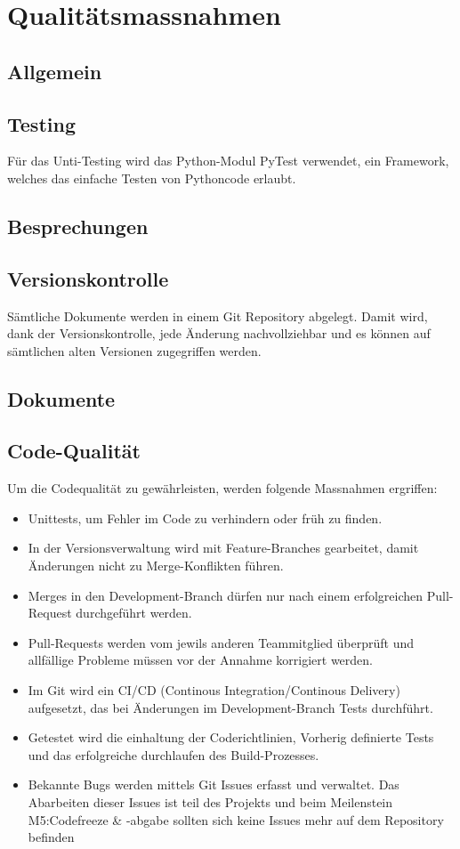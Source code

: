 \documentclass[
	ngerman,
	toc=listof, %
	toc=bibliography, %
	footnotes=multiple, %
	parskip=half, %
	numbers=noendperiod %
]{scrartcl}
\begin{document}
		

\section{Qualitätsmassnahmen}
	\subsection{Allgemein}

	\subsection{Testing}
		Für das Unti-Testing wird das Python-Modul PyTest verwendet, ein Framework, welches das einfache Testen von Pythoncode erlaubt.

	\subsection{Besprechungen}

	\subsection{Versionskontrolle}
		Sämtliche Dokumente werden in einem Git Repository abgelegt. Damit wird, dank der Versionskontrolle, 
		jede Änderung nachvollziehbar und es können auf sämtlichen alten Versionen zugegriffen werden.

	\subsection{Dokumente}

	\subsection{Code-Qualität}
		Um die Codequalität zu gewährleisten, werden folgende Massnahmen ergriffen:
		\begin{itemize}
			\item Unittests, um Fehler im Code zu verhindern oder früh zu finden.
			\item In der Versionsverwaltung wird mit Feature-Branches gearbeitet, damit Änderungen nicht zu Merge-Konflikten führen.
			\item Merges in den Development-Branch dürfen nur nach einem erfolgreichen Pull-Request durchgeführt werden.
			\item Pull-Requests werden vom jewils anderen Teammitglied überprüft und allfällige Probleme müssen vor der Annahme korrigiert werden.
			\item Im Git wird ein CI/CD (Continous Integration/Continous Delivery) aufgesetzt, das bei Änderungen im Development-Branch Tests durchführt.
			\item Getestet wird die einhaltung der Coderichtlinien, Vorherig definierte Tests und das erfolgreiche durchlaufen des Build-Prozesses.
			\item Bekannte Bugs werden mittels Git Issues erfasst und verwaltet. Das Abarbeiten dieser Issues ist teil des Projekts und beim Meilenstein M5:Codefreeze \& -abgabe sollten sich keine Issues mehr auf dem Repository befinden
		\end{itemize}
\end{document}

